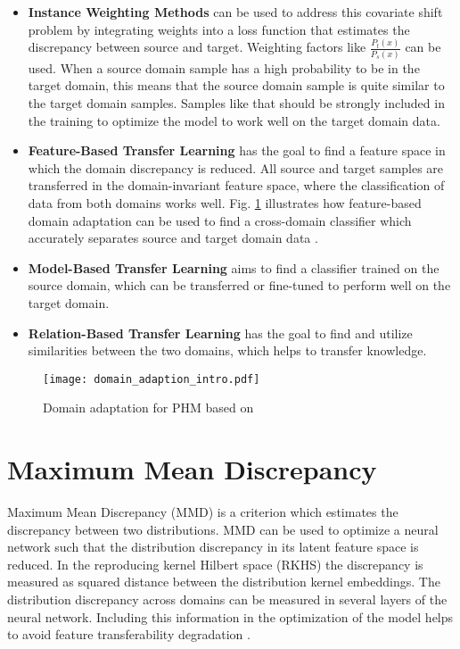\begin{itemize}
\item \textbf{Instance Weighting Methods} can be used to address this covariate shift problem by integrating weights into a loss function that estimates the discrepancy between source and target. Weighting factors like $\frac{P_{t}(x)}{P_{s}(x)}$ can be used. When a source domain sample has a high probability to be in the target domain, this means that the source domain sample is quite similar to the target domain samples. Samples like that should be strongly included in the training to optimize the model to work well on the target domain data.
\item \textbf{Feature-Based Transfer Learning} has the goal to find a feature space in which the domain discrepancy is reduced. All source and target samples are transferred in the domain-invariant feature space, where the classification of data from both domains works well. Fig. \ref{fig:Domain_adaption_intro} illustrates how feature-based domain adaptation can be used to find a cross-domain classifier which accurately separates source and target domain data \cite{Pandhare2021}. 
\item \textbf{Model-Based Transfer Learning} aims to find a classifier trained on the source domain, which can be transferred or fine-tuned to perform well on the target domain.
\item \textbf{Relation-Based Transfer Learning} has the goal to find and utilize similarities between the two domains, which helps to transfer knowledge. 
\end{itemize}

\begin{figure}[H]
  \centering
  \texttt{[image: domain\_adaption\_intro.pdf]}
  \caption {Domain adaptation for PHM based on \cite{Pandhare2021}} \label{fig:Domain_adaption_intro}
\end{figure}


\section{Maximum Mean Discrepancy}
Maximum Mean Discrepancy (MMD) is a criterion which estimates the discrepancy between two distributions. MMD can be used to optimize a neural network such that the distribution discrepancy in its latent feature space is reduced. In the reproducing kernel Hilbert space (RKHS) the discrepancy is measured as squared distance between the distribution kernel embeddings. The distribution discrepancy across domains can be measured in several layers of the neural network. Including this information in the optimization of the model helps to avoid feature transferability degradation \cite{li2020}. 

